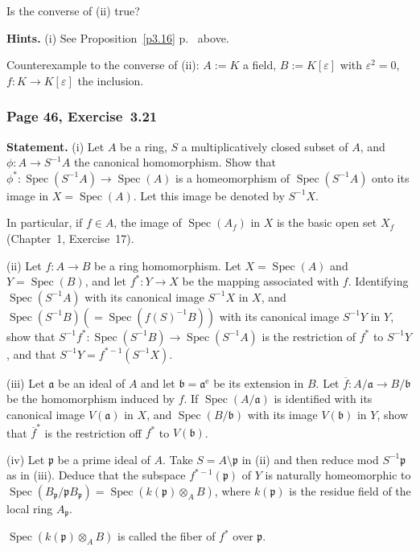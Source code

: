 \documentclass[12pt,letterpaper]{article}%
\newcommand{\oo}{\operatorname}\newcommand{\ooo}{\operatorname*}
\newcommand{\mf}{\mathfrak}
\newcommand{\aaa}{\mf a}
\newcommand{\bbb}{\mf b}
\newcommand{\ppp}{\mf p}
\newcommand{\ov}{\overline}
\newcommand{\Spec}{\operatorname{Spec}}\newcommand{\Sp}{\operatorname{Spec}}
\newcommand{\nn}{\noindent}
\begin{document}
\nn Is the converse of (ii) true?

\nn\textbf{Hints.} (i) See Proposition~\ref{p3.16} p.~\pageref{p3.16} above. 

Counterexample to the converse of (ii): $A:=K$ a field, $B:=K[\varepsilon]$ with $\varepsilon^2=0$, $f:K\to K[\varepsilon]$ the inclusion. 

\subsubsection{Page 46, Exercise~3.21}\label{321iv}%

\textbf{Statement.} (i) Let $A$ be a ring, $S$ a multiplicatively closed subset of $A$, and $\phi:A\to S^{-1}A$ the canonical homomorphism. Show that $\phi^*:\Spec(S^{-1}A)\to\Spec(A)$ is a homeomorphism of $\Spec(S^{-1}A)$ onto its image in $X=\Spec(A)$. Let this image be denoted by $S^{-1}X$.

\nn In particular, if $f\in A$, the image of $\Spec(A_f)$ in $X$ is the basic open set $X_f$ (Chapter~1, Exercise~17).

\nn(ii) Let $f:A\to B$ be a ring homomorphism. Let $X=\Spec(A)$ and $Y=\Spec(B)$, and let $f^*:Y\to X$ be the mapping associated with $f$. Identifying $\Spec(S^{-1}A)$ with its canonical image $S^{-1}X$ in $X$, and $\Spec(S^{-1}B)(=\Spec(f(S)^{-1}B))$ with its canonical image $S^{-1}Y$ in $Y$, show that $S^{-1}f^*:\Spec(S^{-1}B)\to\Spec(S^{-1}A)$ is the restriction of $f^*$ to $S^{-1}Y$, and that $S^{-1}Y=f^{*-1}(S^{-1}X)$.

\nn(iii) Let $\aaa$ be an ideal of $A$ and let $\bbb=\aaa^{\oo e}$ be its extension in $B$. Let $\ov f:A/\aaa\to B/\bbb$ be the homomorphism induced by $f$. If $\Spec(A/\aaa)$ is identified with its canonical image $V(\aaa)$ in $X$, and $\Spec(B/\bbb)$ with its image $V(\bbb)$ in $Y$, show that $\ov f^*$ is the restriction off $f^*$ to $V(\bbb)$.

\nn(iv) Let $\ppp$ be a prime ideal of $A$. Take $S=A\setminus\ppp$ in (ii) and then reduce mod $S^{-1}\ppp$ as in (iii). Deduce that the subspace $f^{*-1}(\ppp)$ of $Y$ is naturally homeomorphic to $\Spec(B_\ppp/\ppp B_\ppp)=\Spec(k(\ppp)\otimes_AB)$, where $k(\ppp)$ is the residue field of the local ring $A_\ppp$.

$\Spec(k(\ppp)\otimes_AB)$ is called the fiber of $f^*$ over $\ppp$.
\end{document}

